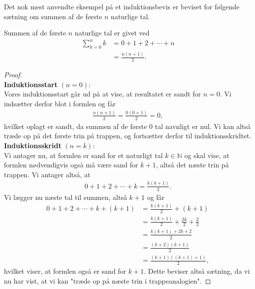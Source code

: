 Det nok mest anvendte eksempel på et induktionsbevis er beviset for følgende sætning om summen af de første $n$ naturlige tal.
\begin{setn}
	Summen af de første $n$ naturlige tal er givet ved 
	\begin{align*}
		\sum_{k = 0}^n k &= 0 + 1 + 2 +\cdots + n  \\
		&= \frac{n(n+1)}{2}. 
	\end{align*}
\end{setn}
\newpage
\begin{proof}\phantom{h}\\
	\textbf{Induktionsstart} $(n = 0)$:\\
	Vores induktionsstart går ud på at vise, at resultatet er sandt for $n = 0$. Vi indsætter derfor blot i formlen og 
	får
	\begin{align*}
		\frac{n(n+1)}{2} = \frac{0(0+1)}{2} = 0,
	\end{align*}
	hvilket oplagt er sandt, da summen af de første $0$ tal navnligt er nul. Vi kan altså træde op på det første trin på
	trappen, og fortsætter derfor til induktionsskridtet. \\
	\textbf{Induktionsskridt} $(n = k)$:\\
	Vi antager nu, at formlen er sand for et naturligt tal $k \in \mathbb{N}$ og skal vise, at formlen nødvendigvis også 
	må være sand for $k + 1$, altså det næste trin på trappen. Vi antager altså, at
	\begin{align*}
		0 + 1 + 2 + \cdots + k = \frac{k(k+1)}{2}.
	\end{align*}
	Vi lægger nu næste tal til summen, altså $k + 1$ og får
	\begin{align*}
		0 + 1 + 2 + \cdots + k + (k + 1) &= \frac{k(k + 1)}{2} + (k + 1)\\
		&= \frac{k(k+1)}{2} + \frac{2k}{2} + \frac{2}{2}\\
		&= \frac{k(k+1)+2k + 2}{2}\\
		&= \frac{(k+2)(k+1)}{2}\\
		&= \frac{(k+1)((k+1)+1)}{2},
	\end{align*}
	hvilket viser, at formlen også er sand for $k + 1$. Dette beviser altså sætning, da vi nu har vist, at vi kan "træde
	op på næste trin i trappeanalogien".
\end{proof}
